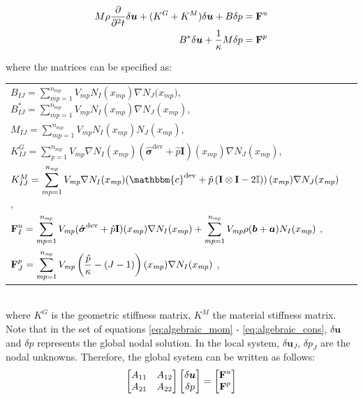 \documentclass[11pt,english]{article}
\def\stress{\boldsymbol{\sigma}}
\def\Identity{\mathbf{I}}
\def\mp{\textit{mp}}
\begin{document}
\begin{align}
    M \rho \dfrac{\partial}{\partial^2 t} \delta \boldsymbol{u} + (K^G+K^M) \delta \boldsymbol{u} + B \delta p &= \boldsymbol{\rm{F}}^{u} \label{eq:algebraic_mom}\\
     B^{*}\delta \boldsymbol{u} + \dfrac{1}{\kappa} M \delta p   & = \boldsymbol{\rm{F}}^{p} \label{eq:algebraic_cons}
\end{align}

where the matrices can be specified as:

\begin{tabular}{ll}
    $B_{IJ}=\displaystyle\sum^{n_{\mp}}_{\mp=1} V_{\mp}  N_I(x_{\mp}) \nabla N_J({x_{\mp})} $, \quad $B^*_{IJ}=\displaystyle\sum^{n_{\mp}}_{\mp=1} V_{\mp}  N_I(x_{\mp}) \nabla  N_J (x_{\mp})$, \\ 
    $M_{IJ}=\displaystyle\sum^{n_{\mp}}_{\mp=1} V_{\mp} N_I(x_{\mp}) N_J(x_{\mp})$, \\ 
    $K^G_{IJ}=\displaystyle \sum^{n_{\mp}}_{p=1}  V_{\mp} \nabla N_I ({x_{\mp}}) 
          (\hat{\stress}^{\text{dev}}+\hat{p}\Identity) (x_{\mp}) \nabla N_J (x_{\mp})$,
    \\
    $K^M_{IJ}= \displaystyle\sum^{n_{\mp}}_{\mp=1}  V_{\mp} \nabla  N_I (x_{\mp}) (\mathbbm{c}^{\text{dev}}+\hat{p}\left( \Identity \otimes \Identity -2\mathbb{I})\right)(x_{\mp}) \nabla N_J (x_{\mp})$,  
    \\ 
    $\boldsymbol{\rm{F}}^u_{I}=\displaystyle\sum^{n_{\mp}}_{\mp=1} V_{\mp} (\hat{\stress}^{\text{dev}}+\hat{p}\Identity)(x_{\mp}) \nabla N_I(x_{\mp}) + \sum^{n_{\mp}}_{\mp=1} V_{\mp} \rho (\boldsymbol{b} +\boldsymbol{a})  N_I (x_{\mp})$ , 
    \\ 
    $\boldsymbol{\rm{F}}^p_{J}=\displaystyle\sum^{n_{\mp}}_{\mp=1} V_{\mp} \left(\dfrac{\hat{p}}{\kappa} -(J-1)\right) (x_{\mp}) \nabla N_I(x_{\mp})$ ,
    \\ 
\end{tabular}\\
where $K^G$ is the geometric stiffness matrix, $K^M$ the material stiffness matrix. Note that in the set of equations \eqref{eq:algebraic_mom} - \eqref{eq:algebraic_cons}, $\delta \boldsymbol{u}$ and $\delta p$ represents the global nodal solution. In the local system, $\delta \boldsymbol{u}_J$, $\delta p_J$ are the nodal unknowns.  Therefore, the global system can be written as follows:
\begin{gather}
    \begin{bmatrix}
        A_{11} & A_{12}\\
        A_{21}  & A_{22} 
    \end{bmatrix}
    \begin{bmatrix}
        \delta \boldsymbol{u}\\  \delta p
    \end{bmatrix}
    =
    \begin{bmatrix}
        \boldsymbol{\rm{F}}^u\\ \boldsymbol{\rm{F}}^p
    \end{bmatrix}
    \label{eq:Algebraic-MPM}
\end{gather}
\end{document}
